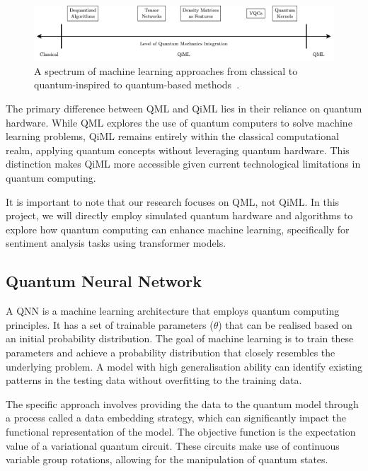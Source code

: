 \begin{figure}[ht] \centering
  \includegraphics[width=\textwidth]{img/qiml_levels.png}
  \caption{A spectrum of machine learning approaches from classical to
    quantum-inspired to quantum-based
  methods~\cite{huynh2023quantuminspiredmachinelearningsurvey}.}
  \label{fig:qiml_levels}
\end{figure}

The primary difference between \gls{QML} and \gls{QiML} lies in their
reliance on quantum hardware. While \gls{QML} explores the use of
quantum computers to solve machine learning problems, \gls{QiML}
remains entirely within the classical computational realm, applying
quantum concepts without leveraging quantum hardware. This
distinction makes \gls{QiML} more accessible given current
technological limitations in quantum computing.

It is important to note that our research focuses on \gls{QML}, not
\gls{QiML}. In this project, we will directly employ simulated
quantum hardware and algorithms to explore how quantum computing can
enhance machine learning, specifically for sentiment analysis tasks
using transformer models.

\subsection{Quantum Neural Network}
\label{subsec:quantum_neural_network}
A \gls{QNN} is a machine learning architecture that
employs quantum computing principles. It has a set of trainable
parameters (\(\theta\)) that can be realised based on an initial
probability distribution. The goal of machine learning is to train
these parameters and achieve a probability distribution that closely
resembles the underlying problem. A model with high generalisation
ability can identify existing patterns in the testing data without
overfitting to the training data.

The specific approach involves providing the data to the quantum
model through a process called a data embedding strategy, which can
significantly impact the functional representation of the model. The
objective function is the expectation value of a variational
quantum circuit. These circuits make use of continuous variable group
rotations, allowing for the manipulation of quantum states.

